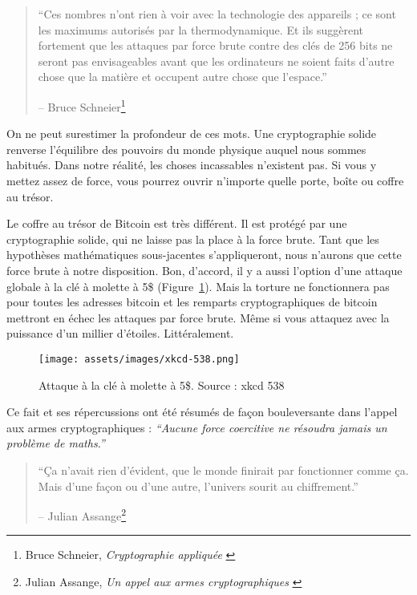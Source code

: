 \begin{quotation}\begin{samepage}
\enquote{Ces nombres n'ont rien à voir avec la technologie des appareils ; ce
sont les maximums autorisés par la thermodynamique. Et ils suggèrent fortement
que les attaques par force brute contre des clés de 256 bits ne seront pas
envisageables avant que les ordinateurs ne soient faits d'autre chose que la
matière et occupent autre chose que l'espace.}
\begin{flushright} -- Bruce Schneier\footnote{Bruce Schneier,
\textit{Cryptographie appliquée} \cite{bruce-schneier}}
\end{flushright}\end{samepage}\end{quotation}

On ne peut surestimer la profondeur de ces mots. Une cryptographie solide
renverse l'équilibre des pouvoirs du monde physique auquel nous sommes habitués.
Dans notre réalité, les choses incassables n'existent pas. Si vous y mettez
assez de force, vous pourrez ouvrir n'importe quelle porte, boîte ou coffre au
trésor.

Le coffre au trésor de Bitcoin est très différent. Il est protégé par une
cryptographie solide, qui ne laisse pas la place à la force brute. Tant que les
hypothèses mathématiques sous-jacentes s'appliqueront, nous n'aurons que cette
force brute à notre disposition. Bon, d'accord, il y a aussi l'option d'une
attaque globale à la clé à molette à 5\$ (Figure~\ref{fig:xkcd-538}). Mais la
torture ne fonctionnera pas pour toutes les adresses bitcoin et les remparts
cryptographiques de bitcoin mettront en échec les attaques par force brute.
Même si vous attaquez avec la puissance d'un millier d'étoiles. Littéralement.

\begin{figure}
  \centering
  \texttt{[image: assets/images/xkcd-538.png]}
  \caption{Attaque à la clé à molette à 5\$. Source : xkcd 538}
  \label{fig:xkcd-538}
\end{figure}

Ce fait et ses répercussions ont été résumés de façon bouleversante dans l'appel
aux armes cryptographiques : \textit{\enquote{Aucune force coercitive ne
résoudra jamais un problème de maths.}}

\begin{quotation}\begin{samepage}
\enquote{Ça n'avait rien d'évident, que le monde finirait par fonctionner comme
ça. Mais d'une façon ou d'une autre, l'univers sourit au chiffrement.}
\begin{flushright} -- Julian Assange\footnote{Julian Assange, \textit{Un appel
aux armes cryptographiques} \cite{call-to-cryptographic-arms}}
\end{flushright}\end{samepage}\end{quotation}

